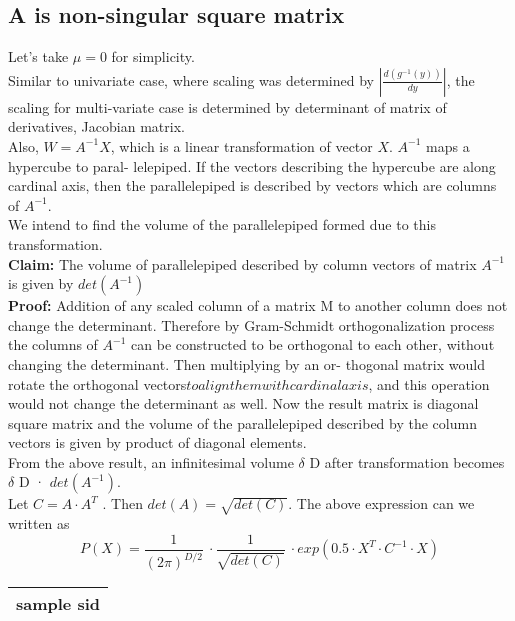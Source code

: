 \documentclass{article}
\begin{document}
\subsection{A is non-singular square matrix}
Let’s take $\mu = 0$ for simplicity.\\
Similar to univariate case, where scaling was determined by $\left|\frac{d(g^{-1}(y))}{dy}\right|$, the scaling for multi-variate
case is determined by determinant of matrix of derivatives, Jacobian matrix.\\
Also, $W = A^{-1}X$, which is a linear transformation of vector $X$. $A^{-1}$ maps a hypercube to paral-
lelepiped. If the vectors describing the hypercube are along cardinal axis, then the parallelepiped
is described by vectors which are columns of $A^{-1}$.\\
We intend to find the volume of the parallelepiped formed due to this transformation.\\
\textbf{Claim: } The volume of parallelepiped described by column vectors of matrix $A^{-1}$ is given by
$det(A^{-1})$\\
\textbf{Proof: } Addition of any scaled column of a matrix M to another column does not change the
determinant.
Therefore by Gram-Schmidt orthogonalization process the columns of $A^{-1}$ can be constructed
to be orthogonal to each other, without changing the determinant. Then multiplying by an or-
thogonal matrix would rotate the orthogonal vectors\(to align them with cardinal axis\), and this
operation would not change the determinant as well. Now the result matrix is diagonal square
matrix and the volume of the parallelepiped described by the column vectors is given by product
of diagonal elements.\\
\newline
From the above result, an infinitesimal volume $\delta$ D after transformation becomes $\delta$ D · $det(A^{-1} )$.\\
\newline
Let $C = A\cdot A^{T}$ . Then $det(A) = \sqrt{det(C)}$. The above expression can we written as\\
\begin{equation}
    P(X) = \frac{1}{(2\pi)^{D/2}}\ \cdot \frac{1}{\sqrt{det(C)}}\ \cdot exp(0.5 \cdot X^{T} \cdot C^{-1} \cdot X)
\end{equation}
%
\begin{tabular}
    {|p{3cm}|p{3cm}||p{3cm}|}
    \hline
    \multicolumn{3}{|c|}{sample sid}\\
    \hline
\end{tabular}


\end{document}
